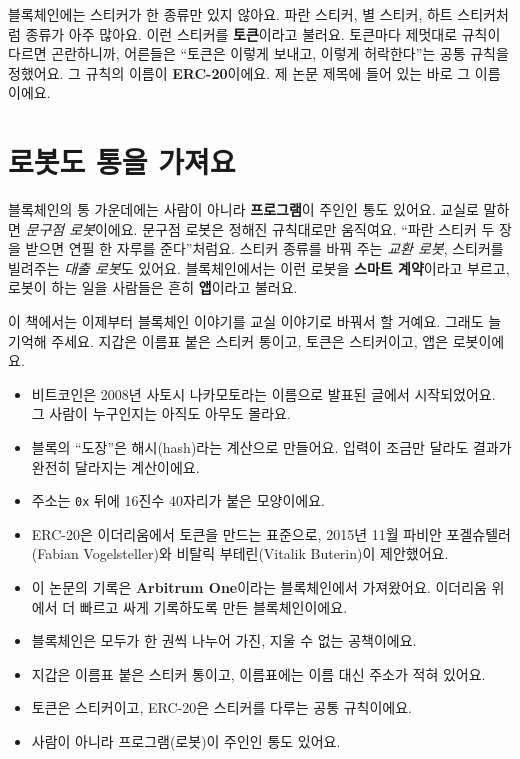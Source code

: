 블록체인에는 스티커가 한 종류만 있지 않아요.
파란 스티커, 별 스티커, 하트 스티커처럼 종류가 아주 많아요.
이런 스티커를 \textbf{토큰}이라고 불러요.
토큰마다 제멋대로 규칙이 다르면 곤란하니까, 어른들은 “토큰은 이렇게 보내고, 이렇게 허락한다”는 공통 규칙을 정했어요.
그 규칙의 이름이 \textbf{ERC-20}이에요.
제 논문 제목에 들어 있는 바로 그 이름이에요.

\section{로봇도 통을 가져요}

블록체인의 통 가운데에는 사람이 아니라 \textbf{프로그램}이 주인인 통도 있어요.
교실로 말하면 \emph{문구점 로봇}이에요.
문구점 로봇은 정해진 규칙대로만 움직여요.
“파란 스티커 두 장을 받으면 연필 한 자루를 준다”처럼요.
스티커 종류를 바꿔 주는 \emph{교환 로봇}, 스티커를 빌려주는 \emph{대출 로봇}도 있어요.
블록체인에서는 이런 로봇을 \textbf{스마트 계약}이라고 부르고, 로봇이 하는 일을 사람들은 흔히 \textbf{앱}이라고 불러요.

이 책에서는 이제부터 블록체인 이야기를 교실 이야기로 바꿔서 할 거예요.
그래도 늘 기억해 주세요.
지갑은 이름표 붙은 스티커 통이고, 토큰은 스티커이고, 앱은 로봇이에요.

\begin{deeper}[진짜 용어]
\begin{itemize}
\item 비트코인은 2008년 사토시 나카모토라는 이름으로 발표된 글에서 시작되었어요. 그 사람이 누구인지는 아직도 아무도 몰라요.
\item 블록의 “도장”은 해시(hash)라는 계산으로 만들어요. 입력이 조금만 달라도 결과가 완전히 달라지는 계산이에요.
\item 주소는 \texttt{0x} 뒤에 16진수 40자리가 붙은 모양이에요.
\item ERC-20은 이더리움에서 토큰을 만드는 표준으로, 2015년 11월 파비안 포겔슈텔러(Fabian Vogelsteller)와 비탈릭 부테린(Vitalik Buterin)이 제안했어요.
\item 이 논문의 기록은 \textbf{Arbitrum One}이라는 블록체인에서 가져왔어요. 이더리움 위에서 더 빠르고 싸게 기록하도록 만든 블록체인이에요.
\end{itemize}
\end{deeper}

\begin{learned}
\begin{itemize}
\item 블록체인은 모두가 한 권씩 나누어 가진, 지울 수 없는 공책이에요.
\item 지갑은 이름표 붙은 스티커 통이고, 이름표에는 이름 대신 주소가 적혀 있어요.
\item 토큰은 스티커이고, ERC-20은 스티커를 다루는 공통 규칙이에요.
\item 사람이 아니라 프로그램(로봇)이 주인인 통도 있어요.
\end{itemize}
\end{learned}
